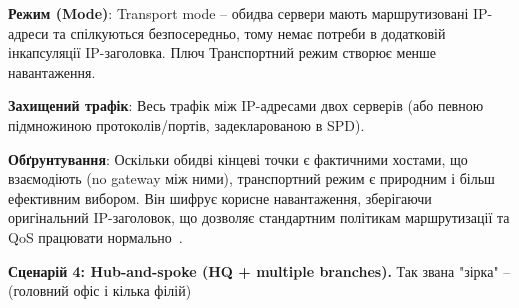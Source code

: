 \textbf{Режим (Mode)}: Transport mode -- обидва сервери мають маршрутизовані IP-адреси та спілкуються безпосередньо, 
тому немає потреби в додатковій інкапсуляції IP-заголовка. Плюч Транспортний режим створює менше навантаження.

\textbf{Захищений трафік}: Весь трафік між IP-адресами двох серверів (або певною підмножиною протоколів/портів, 
задекларованою в SPD).

\textbf{Обґрунтування}: Оскільки обидві кінцеві точки є фактичними хостами, що взаємодіють (no gateway між ними), 
транспортний режим є природним і більш ефективним вибором. Він шифрує корисне навантаження, зберігаючи оригінальний 
IP-заголовок, що дозволяє стандартним політикам маршрутизації та QoS працювати нормально~\cite{rfc4301}.

\bigskip
\noindent\textbf{Сценарій 4: Hub-and-spoke (HQ + multiple branches).} Так звана "зірка"{} -- (головний офіс і 
кілька філій)

